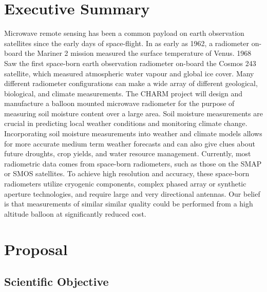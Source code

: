 \documentclass[12pt]{article}
\begin{document}
\listoftables
\newpage

\sectionfont{\scshape}


\section{Executive Summary}
Microwave remote sensing has been a common payload on earth observation satellites since the early days of space-flight. In as early as 1962, a radiometer on-board the Mariner 2 mission measured the surface temperature of Venus. 1968 Saw the first space-born earth observation radiometer on-board the  Cosmos 243 satellite, which measured atmospheric water vapour and global ice cover. Many different radiometer configurations can make a wide array of different geological, biological, and climate measurements. The CHARM project will design and manufacture a balloon mounted microwave radiometer for the purpose of measuring soil moisture content over a large area. Soil moisture measurements are crucial in predicting local weather conditions and monitoring climate change. Incorporating soil moisture measurements into weather and climate models allows for more accurate medium term weather forecasts and can also give clues about future droughts, crop yields, and water resource management. Currently, most radiometric data comes from space-born radiometers, such as those on the SMAP or SMOS satellites. To achieve high resolution and accuracy, these space-born radiometers utilize cryogenic components, complex phased array or synthetic aperture technologies, and require large and very directional antennas. Our belief is that measurements of similar similar quality could be performed from a high altitude balloon at significantly reduced cost. 

\newpage

\section{Proposal}
\subsection{Scientific Objective}
\end{document}
